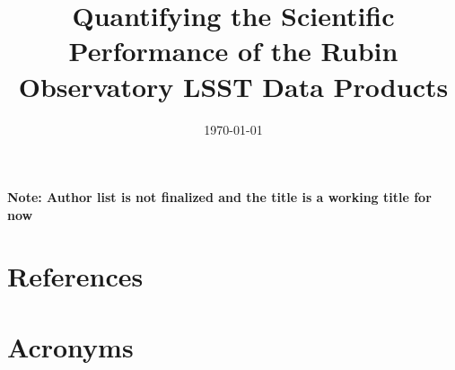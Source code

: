 \documentclass[]{spie}
\date{\today}
\title{Quantifying the Scientific Performance of the Rubin Observatory LSST Data Products}
\begin{document}
\maketitle

\textbf{Note: Author list is not finalized and the title is a working title for now }




%

\appendix
%
\section{References} \label{sec:bib}



\section{Acronyms} \label{sec:acronyms}

\end{document}
